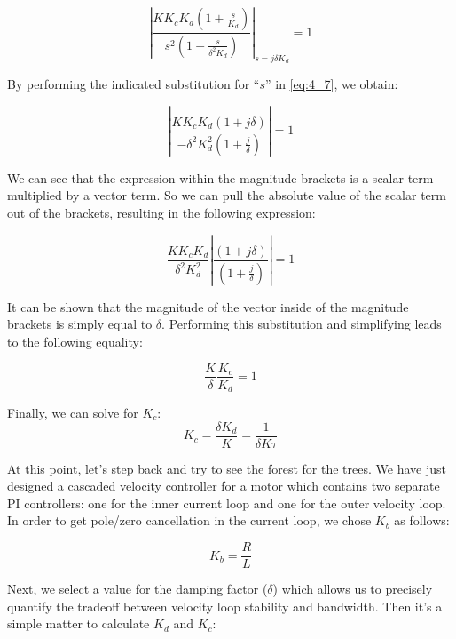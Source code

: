 \begin{equation}\label{eq:4_7}
    \left|\frac{KK_cK_d \left(1+\frac{s}{K_d}\right)}{s^2 \left(1+\frac{s}{\delta^2 K_d}\right)}\right|_{s=j\delta K_d} = 1
\end{equation}

By performing the indicated substitution for “$s$” in \ref{eq:4_7}, we obtain:

\begin{equation}\label{eq:4_8}
    \left|\frac{KK_cK_d \left(1+j\delta\right)}{-\delta^2 K_d^2 \left(1+\frac{j}{\delta}\right)}\right| = 1
\end{equation}

We can see that the expression within the magnitude brackets is a scalar term multiplied by a vector term.  So we can pull the absolute value of the scalar term out of the brackets, resulting in the following expression:

\begin{equation}\label{eq:4_9}
    \frac{KK_cK_d}{\delta^2 K_d^2}\left|\frac{\left(1+j\delta\right)}{\left(1+\frac{j}{\delta}\right)}\right| = 1
\end{equation}

It can be shown that the magnitude of the vector inside of the magnitude brackets is simply equal to $\delta$.  Performing this substitution and simplifying leads to the following equality:

\begin{equation}\label{eq:4_10}
    \frac{K}{\delta}\frac{K_c}{K_d} = 1
\end{equation}

Finally, we can solve for $K_c$:
\begin{equation}\label{eq:4_11}
    K_c = \frac{\delta K_d}{K} = \frac{1}{\delta K \tau}
\end{equation}

At this point, let’s step back and try to see the forest for the trees.  We have just designed a cascaded velocity controller for a motor which contains two separate PI controllers: one for the inner current loop and one for the outer velocity loop.  In order to get pole/zero cancellation in the current loop, we chose $K_b$ as follows:

\begin{equation} \label{eq:4_12}
    K_b = \frac{R}{L}
\end{equation}

Next, we select a value for the damping factor ($\delta$) which allows us to precisely quantify the tradeoff between velocity loop stability and bandwidth.  Then it’s a simple matter to calculate $K_d$ and $K_c$:

